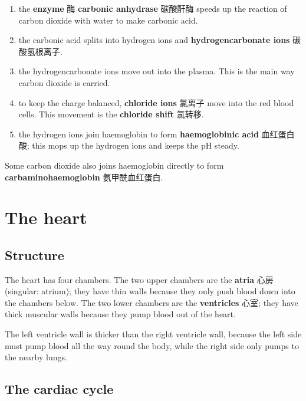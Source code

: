 \documentclass[11pt]{article}
\begin{document}
\begin{enumerate}
\item the \textbf{enzyme} 酶 \textbf{carbonic anhydrase} 碳酸酐酶 speeds up the reaction of carbon dioxide with water to make carbonic acid.

\item the carbonic acid splits into hydrogen ions and \textbf{hydrogencarbonate ions} 碳酸氢根离子.

\item the hydrogencarbonate ions move out into the plasma. This is the main way carbon dioxide is carried.

\item to keep the charge balanced, \textbf{chloride ions} 氯离子 move into the red blood cells. This movement is the \textbf{chloride shift} 氯转移.

\item the hydrogen ions join haemoglobin to form \textbf{haemoglobinic acid} 血红蛋白酸; this mops up the hydrogen ions and keeps the pH steady.

\end{enumerate}

Some carbon dioxide also joins haemoglobin directly to form \textbf{carbaminohaemoglobin} 氨甲酰血红蛋白.

\section*{The heart}

\subsection*{Structure}

The heart has four chambers. The two upper chambers are the \textbf{atria} 心房 (singular: atrium); they have thin walls because they only push blood down into the chambers below. The two lower chambers are the \textbf{ventricles} 心室; they have thick muscular walls because they pump blood out of the heart.

The left ventricle wall is thicker than the right ventricle wall, because the left side must pump blood all the way round the body, while the right side only pumps to the nearby lungs.

\subsection*{The cardiac cycle}
\end{document}
